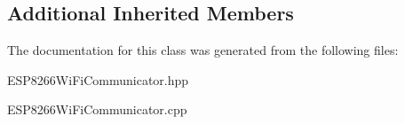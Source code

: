 \subsection*{Additional Inherited Members}


The documentation for this class was generated from the following files\+:\begin{DoxyCompactItemize}
\item 
E\+S\+P8266\+Wi\+Fi\+Communicator.\+hpp\item 
E\+S\+P8266\+Wi\+Fi\+Communicator.\+cpp\end{DoxyCompactItemize}
